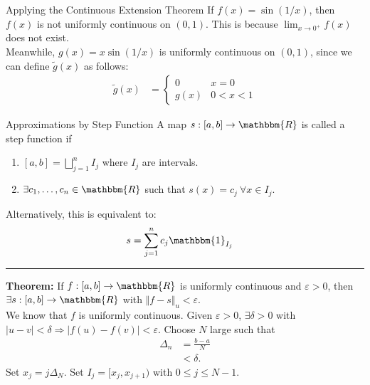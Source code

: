 \documentclass[10pt]{extarticle}
\newcommand{\R}{\mathbbm{R}}
\begin{document}
  \begin{problem}{Applying the Continuous Extension Theorem}
    If $f(x) = \sin(1/x)$, then $f(x)$ is not uniformly continuous on $(0,1)$. This is because $\lim_{x\rightarrow 0^+}f(x)$ does not exist.\\

    Meanwhile, $g(x) = x\sin(1/x)$ is uniformly continuous on $(0,1)$, since we can define $\tilde{g}(x)$ as follows:
    \begin{align*}
      \tilde{g}(x) &= \begin{cases}
        0 & x=0\\
        g(x) & 0 < x < 1
      \end{cases}
    \end{align*}
  \end{problem}
  \begin{problem}{Approximations by Step Function}
    A map $s: [a,b] \rightarrow \R$ is called a step function if
    \begin{enumerate}[(1)]
      \item $\displaystyle [a,b] = \bigsqcup_{j=1}^{n} I_j$ where $I_j$ are intervals.
      \item $\displaystyle \exists c_1,\dots,c_n\in\R$ such that $s(x) = c_j~\forall x\in I_j$.
    \end{enumerate}
    Alternatively, this is equivalent to:
    \begin{align*}
      s &= \sum_{j=1}^{n}c_j\mathbbm{1}_{I_j}
    \end{align*}
    \vspace{4pt}
    \rule{\textwidth}{0.4pt}
    \vspace{4pt}
    \textbf{Theorem:} If $f: [a,b]\rightarrow \R$ is uniformly continuous and $\varepsilon > 0$, then $\exists s: [a,b]\rightarrow \R$ with $\Vert f - s\Vert_u < \varepsilon$.\\

    We know that $f$ is uniformly continuous. Given $\varepsilon > 0$, $\exists \delta > 0$ with $|u-v| < \delta \Rightarrow |f(u) - f(v)| < \varepsilon$. Choose $N$ large such that
    \begin{align*}
      \Delta_{n} &= \frac{b-a}{N}\\
                 &< \delta.
    \end{align*}
    Set $x_j = j\Delta_{N}$. Set $I_j = [x_j,x_{j+1})$ with $0 \leq j \leq N-1$.\\


\end{problem}
\end{document}
